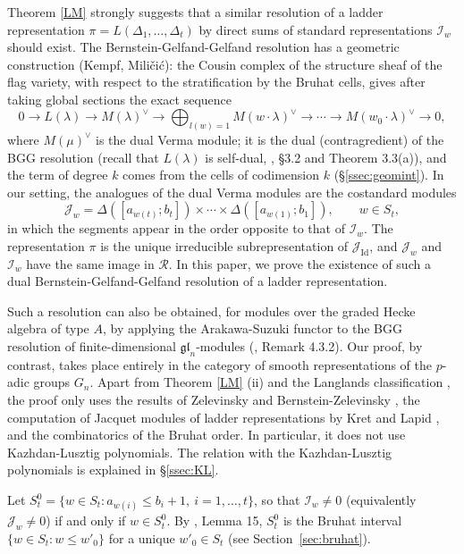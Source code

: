 \documentclass[a4paper,12pt,leqno]{amsart}
\newcommand{\caI}{\mathcal{I}}
\newcommand{\caJ}{\mathcal{J}}
\newcommand{\caR}{\mathcal{R}}
\theoremstyle{plain}
\theoremstyle{definition}
\theoremstyle{definition}
\newcommand{\Id}{\mathrm{Id}}
\begin{document}
Theorem \ref{LM} strongly suggests that a similar resolution of a ladder representation
$\pi=L(\Delta_1,\ldots ,\Delta_t) $
by direct sums of standard representations $\caI_w$  should exist. The
Bernstein-Gelfand-Gelfand resolution has a geometric construction (Kempf, Mili\v{c}i\'c): the Cousin
complex of the structure sheaf of the flag variety, with respect to the stratification by the Bruhat
cells, gives after taking global sections the exact sequence
\[0\rightarrow L(\lambda)\rightarrow M(\lambda)^\vee\rightarrow\bigoplus_{l(w)=1}M(w\cdot\lambda)^\vee
\rightarrow\cdots\rightarrow M(w_0\cdot\lambda)^\vee\rightarrow0,\]
where $M(\mu)^\vee$ is the dual Verma module; it is the dual (contragredient) of the BGG resolution
(recall that $L(\lambda)$ is self-dual, \cite{Hum08}, \S3.2 and Theorem 3.3(a)),
and the term of degree $k$ comes from the cells of codimension $k$ (\S\ref{ssec:geomint}). In our setting,
 the analogues of the dual Verma modules are the costandard modules
\[\caJ_w = \Delta([a_{w(t)}; b_t])\times \cdots \times \Delta([a_{w(1)}; b_1]), \qquad w\in S_t,\]
in which the segments appear in the order opposite to that of $\caI_w$. The representation $\pi$
 is the unique irreducible subrepresentation of $\caJ_{\Id}$, and $\caJ_w$ and $\caI_w$ have
 the same image in $\caR$. In this paper, we prove the existence of such a dual
 Bernstein-Gelfand-Gelfand resolution of a ladder representation.

Such a resolution can also be obtained, for modules over the graded Hecke algebra of type $A$,
by applying the Arakawa-Suzuki functor to the BGG resolution of finite-dimensional
$\mathfrak{gl}_n$-modules (\cite{BC15}, Remark 4.3.2). Our proof, by contrast, takes place entirely 
in the category of smooth representations of the $p$-adic groups $G_n$. 
Apart from Theorem \ref{LM} (ii) and the Langlands classification \cite{Rod82}, the proof only uses
the results of Zelevinsky 
and Bernstein-Zelevinsky \cite{BZ77, Zel80}, the computation of Jacquet modules of ladder representations 
by Kret and Lapid \cite{KL12}, and the combinatorics of the Bruhat order. In particular, it does
not use Kazhdan-Lusztig polynomials.
 The relation with the Kazhdan-Lusztig polynomials is explained in \S\ref{ssec:KL}.

Let $S_t^0=\{w\in S_t : a_{w(i)}\leq b_i+1,\ i=1,\ldots,t\}$, so that $\caI_w\neq 0$ (equivalently
$\caJ_w\neq 0$)
if and only if $w\in S_t^0$. By \cite{LM13}, Lemma 15, $S_t^0$ is the Bruhat interval $\{w\in S_t :
w\leq w'_0\}$
 for a unique $w'_0\in S_t$ (see Section~\ref{sec:bruhat}).
\end{document}
